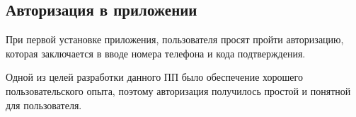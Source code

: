 \subsection{Авторизация в приложении}
\label{sec:usage:auth}

При первой установке приложения, пользователя просят пройти авторизацию, которая заключается в вводе номера телефона и кода подтверждения.




Одной из целей разработки данного ПП было обеспечение хорошего пользовательского опыта, поэтому авторизация получилось простой и понятной для пользователя.